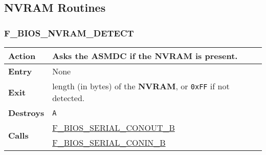     \subsection{NVRAM Routines}

        \subsubsection{F\_BIOS\_NVRAM\_DETECT}
        \label{func:fbiosnvramdetect}
        \begin{tabular}{l p{15cm}}
            \hline\textbf{Action}
            & Asks the \textbf{ASMDC} if the \textbf{NVRAM} is present. \\
            \hline\textbf{Entry} & None \\
            \hline\textbf{Exit} & length (in bytes) of the \textbf{NVRAM}, or
            \texttt{0xFF} if not detected.\\
            \hline\textbf{Destroys} & \texttt{A} \\
            \hline\multirow[t]{2}{4em}{\textbf{Calls}}
            & \hyperref[func:fbiosserialconoutb]{F\_BIOS\_SERIAL\_CONOUT\_B}\\
            & \hyperref[func:fbiosserialconinb]{F\_BIOS\_SERIAL\_CONIN\_B}\\
            \hline
        \end{tabular}